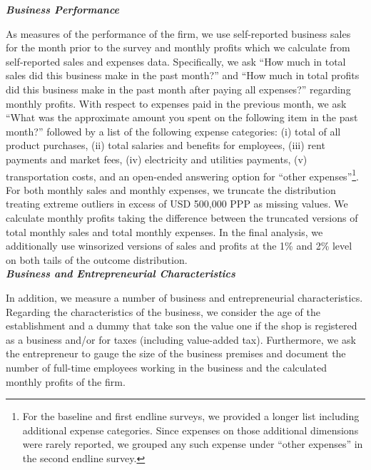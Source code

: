 \documentclass[11.5pt]{article}
\begin{document}
\textbf{\emph{Business Performance}}

As measures of the performance of the firm, we use self-reported business sales for the month prior to the survey and monthly profits which we calculate from self-reported sales and expenses data. Specifically, we ask ``How much in total sales did this business make in the past month?'' and ``How much in total profits did this business make in the past month after paying all expenses?'' regarding monthly profits. With respect to expenses paid in the previous month, we ask ``What was the approximate amount you spent on the following item in the past month?'' followed by a list of the following expense categories: (i) total of all product purchases, (ii) total salaries and benefits for employees, (iii) rent payments and market fees, (iv) electricity and utilities payments, (v) transportation costs, and an open-ended answering option for ``other expenses''\footnote{For the baseline and first endline surveys, we provided a longer list including additional expense categories. Since expenses on those additional dimensions were rarely reported, we grouped any such expense under ``other expenses'' in the second endline survey.}. For both monthly sales and monthly expenses, we truncate the distribution treating extreme outliers in excess of USD 500,000 PPP as missing values. We calculate monthly profits taking the difference between the truncated versions of total monthly sales and total monthly expenses. In the final analysis, we additionally use winsorized versions of sales and profits at the 1\% and 2\% level on both tails of the outcome distribution. \\


\textbf{\emph{Business and Entrepreneurial Characteristics}}

In addition, we measure a number of business and entrepreneurial characteristics.
Regarding the characteristics of the business, we consider the age of the establishment and a dummy that take son the value one if the shop is registered as a business and/or for taxes (including value-added tax). Furthermore, we ask the entrepreneur to gauge the size of the business premises and document the number of full-time employees working in the business and the calculated monthly profits of the firm.
\end{document}
